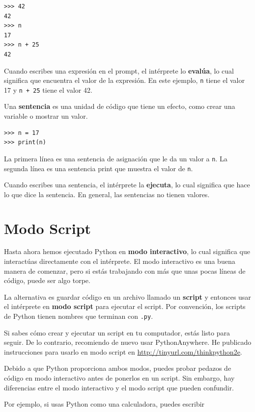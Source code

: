 \documentclass[10pt]{book}
\begin{document}
\begin{verbatim}
>>> 42
42
>>> n
17
>>> n + 25
42
\end{verbatim}
%
Cuando escribes una expresión en el prompt, el intérprete
lo {\bf evalúa}, lo cual significa que encuentra el valor de
la expresión.
En este ejemplo, {\tt n} tiene el valor 17 y
{\tt n + 25} tiene el valor 42.

Una {\bf sentencia} es una unidad de código que tiene un efecto, como
crear una variable o mostrar un valor.

\begin{verbatim}
>>> n = 17
>>> print(n)
\end{verbatim}
%
La primera línea es una sentencia de asignación que le da un valor a
{\tt n}.  La segunda línea es una sentencia print que muestra el
valor de {\tt n}.

Cuando escribes una sentencia, el intérprete la {\bf ejecuta},
lo cual significa que hace lo que dice la sentencia.  En general,
las sentencias no tienen valores.


\section{Modo Script}

Hasta ahora hemos ejecutado Python en {\bf modo interactivo}, lo cual
significa que interactúas directamente con el intérprete.
El modo interactivo es una buena manera de comenzar,
pero si estás trabajando con más que unas pocas líneas de código, puede ser
algo torpe.

La alternativa es guardar código en un archivo llamado un {\bf script} y
entonces usar el intérprete en {\bf modo script} para ejecutar el script.  Por
convención, los scripts de Python tienen nombres que terminan con {\tt .py}.

Si sabes cómo crear y ejecutar un script en tu computador, estás
listo para seguir.  De lo contrario, recomiendo de nuevo usar PythonAnywhere.
He publicado instrucciones para usarlo en modo script en
\url{http://tinyurl.com/thinkpython2e}.

Debido a que Python proporciona ambos modos,
puedes probar pedazos de código en modo interactivo antes de ponerlos
en un script.  Sin embargo, hay diferencias entre el modo interactivo
y el modo script que pueden confundir.

Por ejemplo, si usas Python como una calculadora, puedes escribir
\end{document}
